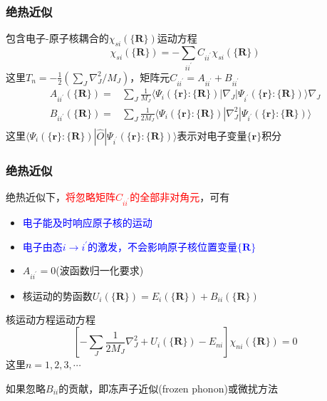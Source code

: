 \documentclass[cjk,slidestop,compress,mathserif,blue]{beamer}
\begin{document}
\frame
{
	\frametitle{绝热近似}
	包含电子-原子核耦合的$\chi_{si}(\{\mathbf{R}\})$运动方程
	\begin{displaymath}
		[T_N+E_i(\{\mathbf{R}\})-E_s]\chi_{si}(\{\mathbf{R}\})=-\sum_{ii^{\prime}}C_{ii^{\prime}}\chi_{si}(\{\mathbf{R}\})
	\end{displaymath}
	这里$T_n=-\frac12(\sum\limits_J\nabla_J^2/M_J)$，矩阵元$C_{ii^{\prime}}=A_{ii^{\prime}}+B_{ii^{\prime}}$
	\begin{displaymath}
		\begin{aligned}
			A_{ii^{\prime}}(\{\mathbf{R}\})=&\sum_J\frac1{M_J}\langle\Psi_i(\{\mathbf{r}\}:\{\mathbf{R}\})|\nabla_J|\Psi_{i^{\prime}}(\{\mathbf{r}\}:\{\mathbf{R}\})\rangle\nabla_J\\
			B_{ii^{\prime}}(\{\mathbf{R}\})=&\sum_J\frac1{2M_J}\langle\Psi_i(\{\mathbf{r}\}:\{\mathbf{R}\})|\nabla_J^2|\Psi_{i^{\prime}}(\{\mathbf{r}\}:\{\mathbf{R}\})\rangle\\
		\end{aligned}
	\end{displaymath}
	这里$\langle\Psi_i(\{\mathbf{r}\}:\{\mathbf{R}\})|\hat O|\Psi_{i^{\prime}}(\{\mathbf{r}\}:\{\mathbf{R}\})\rangle$表示对电子变量$\{\mathbf{r}\}$积分
}

\frame
{
	\frametitle{绝热近似}
	绝热近似下，\textcolor{red}{将忽略矩阵$C_{ii^{\prime}}$的全部非对角元}，可有
	\begin{itemize}
		\item \textcolor{blue}{电子能及时响应原子核的运动}
		\item \textcolor{blue}{电子由态$i\rightarrow i^{\prime}$的激发，不会影响原子核位置变量${\{\mathbf{R}\}}$}
		\item $A_{ii^{\prime}}=0$(波函数归一化要求)
		\item 核运动的势函数$U_i(\{\mathbf{R}\})=E_i(\{\mathbf{R}\})+B_{ii}(\{\mathbf{R}\})$
	\end{itemize}
	核运动方程运动方程
	\begin{displaymath}
		\left[ -\sum_J\frac1{2M_J}\nabla_J^2+U_i(\{\mathbf{R}\})-E_{ni} \right]\chi_{ni}(\{\mathbf{R}\})=0
	\end{displaymath}
这里$n=1,2,3,\cdots$

如果忽略$B_{ii}$的贡献，即冻声子近似(\textrm{frozen phonon})或微扰方法
}
\end{document}
